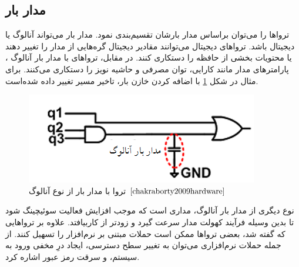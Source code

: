 \subsection {مدار بار}
تروا‌ها را می‌توان براساس مدار بارشان تقسیم‌بندی نمود. مدار بار می‌تواند آنالوگ یا دیجیتال باشد. تروا‌های دیجیتال می‌توانند مقادیر دیجیتال گره‌هایی از مدار را تغییر دهند یا محتویات بخشی از حافظه را دستکاری کنند. در مقابل، تروا‌های با مدار بار آنالوگ ، پارامترهای مدار مانند کارایی، توان مصرفی و حاشیه نویز را دستکاری می‌کنند. برای مثال در شکل  \ref{fig5-3} با اضافه کردن خازن بار، تاخیر مسیر تغییر داده شده‌است.
\begin{figure}
	\begin{center}
		\includegraphics[scale=1]{figs/fig5-3.png}
		\caption[تروا با مدار بار از نوع آنالوگ ]
		{تروا با مدار بار از نوع آنالوگ $\cite{chakraborty2009hardware}$}
		\label{fig5-3}
	\end{center}
\end{figure} 
نوع دیگری از مدار بار آنالوگ، مداری است که موجب افزایش فعالیت سوئیچینگ شود تا بدین وسیله فرآیند کهولت مدار سرعت گیرد و زودتر از کاربیافتد. 
علاوه بر تروا‌هایی که گفته شد، بعضی تروا‌ها ممکن است حملات مبتنی بر نرم‌افزار را تسهیل کنند. از جمله حملات نرم‌افزاری می‌توان به تغییر سطح دسترسی، ایجاد درِ مخفی ورود به سیستم، و سرقت رمز عبور اشاره کرد.
